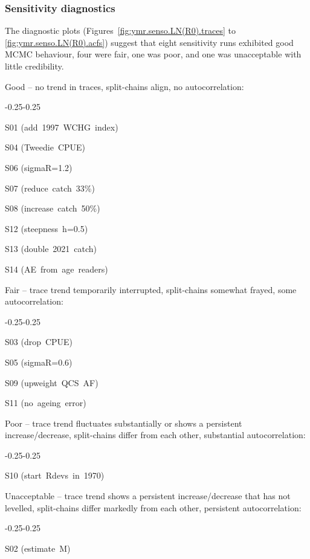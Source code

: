\documentclass[11pt]{book}
\newcommand{\pc}{\%}
\begin{document}
\subsubsection{Sensitivity diagnostics}

The diagnostic plots (Figures~\ref{fig:ymr.senso.LN(R0).traces} to \ref{fig:ymr.senso.LN(R0).acfs}) suggest that eight sensitivity runs exhibited good MCMC behaviour, four were fair, one was poor, and one was unacceptable with little credibility.
\begin{itemize_csas}{}{}
  \item Good -- no trend in traces, split-chains align, no autocorrelation:
  \begin{itemize_csas}{-0.25}{-0.25}
    \item S01 (add~1997~WCHG~index)
    \item S04 (Tweedie~CPUE)
    \item S06 (sigmaR=1.2)
    \item S07 (reduce~catch~33\pc)
    \item S08 (increase~catch~50\pc)
    \item S12 (steepness~h=0.5)
    \item S13 (double~2021~catch)
    \item S14 (AE~from~age~readers)
  \end{itemize_csas}
  \item Fair -- trace trend temporarily interrupted, split-chains somewhat frayed, some autocorrelation:
  \begin{itemize_csas}{-0.25}{-0.25}
    \item S03 (drop~CPUE)
    \item S05 (sigmaR=0.6)
    \item S09 (upweight~QCS~AF)
    \item S11 (no~ageing~error)
  \end{itemize_csas}
  \item Poor -- trace trend fluctuates substantially or shows a persistent increase/decrease, split-chains differ from each other, substantial autocorrelation:
  \begin{itemize_csas}{-0.25}{-0.25}
    \item S10 (start~Rdevs~in~1970)
  \end{itemize_csas}
  \item Unacceptable -- trace trend shows a persistent increase/decrease that has not levelled, split-chains differ markedly from each other, persistent autocorrelation:
  \begin{itemize_csas}{-0.25}{-0.25}
    \item S02 (estimate~M)
  \end{itemize_csas}
\end{itemize_csas}
\end{document}
